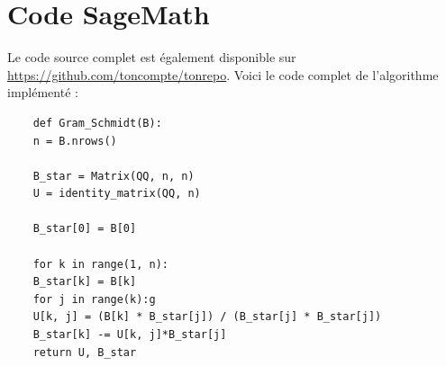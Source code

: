 \documentclass[a4paper,12pt]{report}  %
\theoremstyle{definitionstyle}
\theoremstyle{examplestyle}
\theoremstyle{remarkstyle}
\theoremstyle{propositionstyle}
\theoremstyle{theoremstyle}
\theoremstyle{proofstyle}
\begin{document}
	
	\chapter{Code SageMath}
	Le code source complet est également disponible sur \url{https://github.com/toncompte/tonrepo}.
	\label{sec:annexe_code}
	Voici le code complet de l'algorithme implémenté :
	
	\begin{lstlisting}
	def Gram_Schmidt(B):
	n = B.nrows()
	
	B_star = Matrix(QQ, n, n)
	U = identity_matrix(QQ, n)
	
	B_star[0] = B[0]
	
	for k in range(1, n):
	B_star[k] = B[k]
	for j in range(k):g
	U[k, j] = (B[k] * B_star[j]) / (B_star[j] * B_star[j])
	B_star[k] -= U[k, j]*B_star[j]
	return U, B_star
	
	\end{lstlisting}
	
	
	

	
	\printbibliography
	
\end{document}

